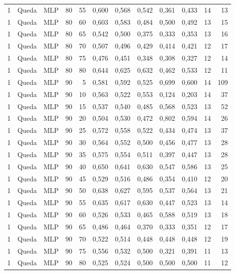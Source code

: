 \begin{longtable}{@{}rllrrrrrrrrr@{}}
1 & Queda & MLP & 80 & 55 & 0,600 & 0,568 & 0,542 & 0,361 & 0,433 & 14 & 13 \\
1 & Queda & MLP & 80 & 60 & 0,603 & 0,583 & 0,484 & 0,500 & 0,492 & 13 & 15 \\
1 & Queda & MLP & 80 & 65 & 0,542 & 0,500 & 0,375 & 0,333 & 0,353 & 13 & 16 \\
1 & Queda & MLP & 80 & 70 & 0,507 & 0,496 & 0,429 & 0,414 & 0,421 & 12 & 17 \\
1 & Queda & MLP & 80 & 75 & 0,476 & 0,451 & 0,348 & 0,308 & 0,327 & 12 & 14 \\
1 & Queda & MLP & 80 & 80 & 0,644 & 0,625 & 0,632 & 0,462 & 0,533 & 12 & 11 \\
1 & Queda & MLP & 90 & 5 & 0,581 & 0,592 & 0,525 & 0,699 & 0,600 & 14 & 109 \\
1 & Queda & MLP & 90 & 10 & 0,563 & 0,522 & 0,553 & 0,124 & 0,203 & 14 & 37 \\
1 & Queda & MLP & 90 & 15 & 0,537 & 0,540 & 0,485 & 0,568 & 0,523 & 13 & 52 \\
1 & Queda & MLP & 90 & 20 & 0,504 & 0,530 & 0,472 & 0,802 & 0,594 & 14 & 26 \\
1 & Queda & MLP & 90 & 25 & 0,572 & 0,558 & 0,522 & 0,434 & 0,474 & 13 & 37 \\
1 & Queda & MLP & 90 & 30 & 0,564 & 0,552 & 0,500 & 0,456 & 0,477 & 13 & 28 \\
1 & Queda & MLP & 90 & 35 & 0,575 & 0,554 & 0,511 & 0,397 & 0,447 & 13 & 28 \\
1 & Queda & MLP & 90 & 40 & 0,650 & 0,641 & 0,630 & 0,547 & 0,586 & 13 & 25 \\
1 & Queda & MLP & 90 & 45 & 0,529 & 0,516 & 0,486 & 0,354 & 0,410 & 12 & 20 \\
1 & Queda & MLP & 90 & 50 & 0,638 & 0,627 & 0,595 & 0,537 & 0,564 & 13 & 21 \\
1 & Queda & MLP & 90 & 55 & 0,635 & 0,617 & 0,630 & 0,447 & 0,523 & 13 & 14 \\
1 & Queda & MLP & 90 & 60 & 0,526 & 0,533 & 0,465 & 0,588 & 0,519 & 13 & 18 \\
1 & Queda & MLP & 90 & 65 & 0,486 & 0,464 & 0,370 & 0,333 & 0,351 & 12 & 17 \\
1 & Queda & MLP & 90 & 70 & 0,522 & 0,514 & 0,448 & 0,448 & 0,448 & 12 & 19 \\
1 & Queda & MLP & 90 & 75 & 0,556 & 0,532 & 0,500 & 0,321 & 0,391 & 11 & 13 \\
1 & Queda & MLP & 90 & 80 & 0,525 & 0,524 & 0,500 & 0,500 & 0,500 & 11 & 12 \\

\end{longtable}
